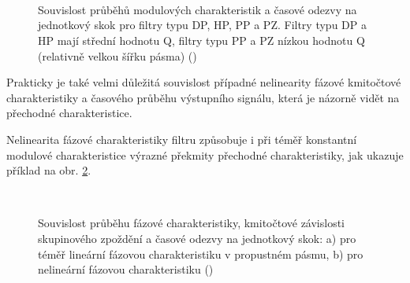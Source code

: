         \begin{figure}[ht!]
          \centering  
             \\
             \\
             \\
          \caption{Souvislost průběhů modulových charakteristik a časové odezvy na jednotkový skok
                  pro filtry typu DP, HP, PP a PZ. Filtry typu DP a HP mají střední hodnotu Q,
                  filtry typu PP a PZ nízkou hodnotu Q (relativně velkou šířku pásma)
                  (\cite[s.~32]{HajekSedlacek2002})}
                  \label{aes:fig032}
        \end{figure}

        Prakticky je také velmi důležitá souvislost případné nelinearity fázové kmitočtové
        charakteristiky a časového průběhu výstupního signálu, která je názorně vidět na přechodné
        charakteristice. 
        
        Nelinearita fázové charakteristiky filtru způsobuje i při téměř konstantní modulové
        charakteristice výrazné překmity přechodné charakteristiky, jak ukazuje příklad na obr.
        \ref{aes:fig033}. 

        \begin{figure}[ht!]
          \centering  
                \\
          \caption{Souvislost průběhu fázové charakteristiky, kmitočtové závislosti skupinového
                  zpoždění a časové odezvy na jednotkový skok: a) pro téměř lineární fázovou
                  charakteristiku v propustném pásmu, b) pro nelineární fázovou charakteristiku
                  (\cite[s.~33]{HajekSedlacek2002})}
                  \label{aes:fig033}
        \end{figure}

